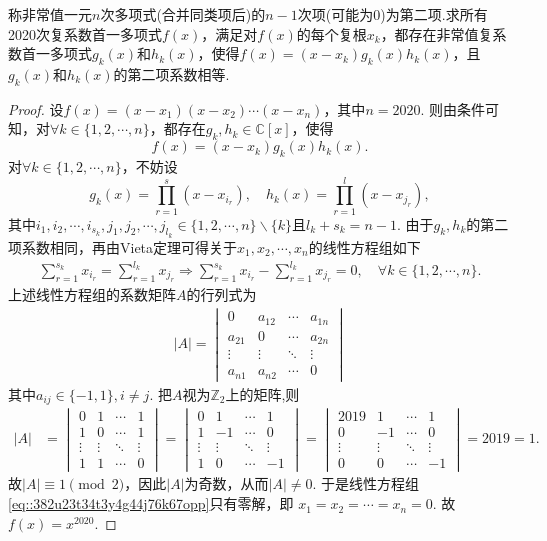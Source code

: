 \documentclass[../../main.tex]{subfiles}%
\begin{document}
\begin{example}
称非常值一元$n$次多项式(合并同类项后)的$n-1$次项(可能为0)为第二项.求所有2020次复系数首一多项式$f(x)$，满足对$f(x)$的每个复根$x_k$，都存在非常值复系数首一多项式$g_k(x)$和$h_k(x)$，使得$f(x)=(x - x_k)g_k(x)h_k(x)$，且$g_k(x)$和$h_k(x)$的第二项系数相等.
\end{example}
\begin{proof}

设$f(x)=(x-x_1)(x-x_2)\cdots(x-x_n)$，其中$n=2020$. 则由条件可知，对$\forall k\in\{1,2,\cdots,n\}$，都存在$g_k,h_k\in\mathbb{C}[x]$，使得
$$f(x)=(x-x_k)g_k(x)h_k(x).$$
对$\forall k\in\{1,2,\cdots,n\}$，不妨设
$$g_k(x)=\prod_{r=1}^s(x-x_{i_r}),\quad h_k(x)=\prod_{r=1}^l(x-x_{j_r}),$$
其中$i_1,i_2,\cdots,i_{s_k},j_1,j_2,\cdots,j_{l_k}\in\{1,2,\cdots,n\}\backslash\{k\}$且$l_k+s_k=n-1$.
由于$g_k,h_k$的第二项系数相同，再由Vieta定理可得关于$x_1,x_2,\cdots,x_n$的线性方程组如下
\begin{align}
\sum_{r=1}^{s_k}x_{i_r}=\sum_{r=1}^{l_k}x_{j_r}\Longrightarrow\sum_{r=1}^{s_k}x_{i_r}-\sum_{r=1}^{l_k}x_{j_r}=0,\quad\forall k\in\{1,2,\cdots,n\}.\label{eq::382u23t34t3y4g44j76k67opp}
\end{align}
上述线性方程组的系数矩阵$A$的行列式为
\begin{align*}
|A|=\begin{vmatrix}
0&a_{12}&\cdots&a_{1n}\\
a_{21}&0&\cdots&a_{2n}\\
\vdots&\vdots&\ddots&\vdots\\
a_{n1}&a_{n2}&\cdots&0
\end{vmatrix}
\end{align*}
其中$a_{ij}\in\{-1,1\},i\ne j$. 把$A$视为$\mathbb{Z}_2$上的矩阵,则
\begin{align*}
|A|&=\begin{vmatrix}
0&1&\cdots&1\\
1&0&\cdots&1\\
\vdots&\vdots&\ddots&\vdots\\
1&1&\cdots&0
\end{vmatrix}=\begin{vmatrix}
0&1&\cdots&1\\
1&-1&\cdots&0\\
\vdots&\vdots&\ddots&\vdots\\
1&0&\cdots&-1
\end{vmatrix}=\begin{vmatrix}
2019&1&\cdots&1\\
0&-1&\cdots&0\\
\vdots&\vdots&\ddots&\vdots\\
0&0&\cdots&-1
\end{vmatrix}=2019=1.
\end{align*}
故$|A|\equiv1\pmod{2}$，因此$|A|$为奇数，从而$|A|\ne0$. 于是线性方程组\eqref{eq::382u23t34t3y4g44j76k67opp}只有零解，即
$x_1=x_2=\cdots=x_n=0$.
故$f(x)=x^{2020}$.

\end{proof}
\end{document}
